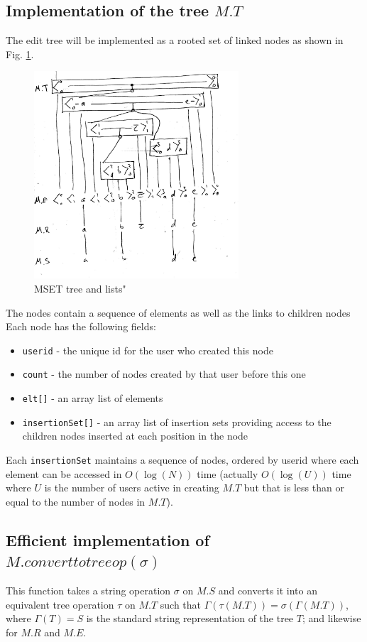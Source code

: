 \documentclass{amsart}
\begin{document}
\subsection{Implementation of the tree $M.T$}
The edit tree will be implemented as a rooted set of linked nodes as shown in Fig. \ref{fig:MSETtree}. 
\begin{figure}[h]
\centering
\includegraphics[width=3.0in]{MSETfig001.jpg}
\caption{MSET tree and lists\label{fig:MSETtree}"}
\end{figure}
The nodes contain a sequence of elements as well as the links to children nodes
Each node has the following fields:
\begin{itemize}
\item {\tt userid} - the unique id for the user who created this node
\item {\tt count} - the number of nodes created by that user before this one
\item {\tt elt[]} - an array list of elements
\item {\tt insertionSet[]} - an array list of insertion sets providing access to the children nodes inserted at each position in the node
\end{itemize}
Each {\tt insertionSet} maintains a sequence of nodes, ordered by userid where
each element can be accessed in $O(\log(N))$ time (actually $O(\log(U))$ time where $U$ is the number of users active in creating $M.T$ but that is less than or equal to the number of nodes in $M.T$).




\subsection{Efficient implementation of $M.converttotreeop(\sigma)$}
This function takes a string operation $\sigma$ on $M.S$ and converts it into
an equivalent tree operation 
$\tau$ on $M.T$ such that
$\Gamma(\tau(M.T)) = \sigma(\Gamma(M.T))$, where $\Gamma(T)=S$ is the standard string representation of the tree $T$; and likewise for $M.R$ and $M.E$.
\end{document}
